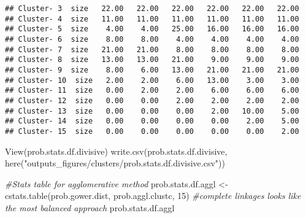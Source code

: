 \documentclass[
]{article}
\newenvironment{Shaded}{\begin{snugshade}}{\end{snugshade}}
\newcommand{\CommentTok}[1]{\textcolor[rgb]{0.56,0.35,0.01}{\textit{#1}}}
\newcommand{\DecValTok}[1]{\textcolor[rgb]{0.00,0.00,0.81}{#1}}
\newcommand{\FunctionTok}[1]{\textcolor[rgb]{0.00,0.00,0.00}{#1}}
\newcommand{\NormalTok}[1]{#1}
\newcommand{\OtherTok}[1]{\textcolor[rgb]{0.56,0.35,0.01}{#1}}
\newcommand{\StringTok}[1]{\textcolor[rgb]{0.31,0.60,0.02}{#1}}
\begin{document}
\begin{verbatim}
## Cluster- 3  size   22.00   22.00   22.00   22.00   22.00   22.00
## Cluster- 4  size   11.00   11.00   11.00   11.00   11.00   11.00
## Cluster- 5  size    4.00    4.00   25.00   16.00   16.00   16.00
## Cluster- 6  size    8.00    8.00    4.00    4.00    4.00    4.00
## Cluster- 7  size   21.00   21.00    8.00    8.00    8.00    8.00
## Cluster- 8  size   13.00   13.00   21.00    9.00    9.00    9.00
## Cluster- 9  size    8.00    6.00   13.00   21.00   21.00   21.00
## Cluster- 10  size   2.00    2.00    6.00   13.00    3.00    3.00
## Cluster- 11  size   0.00    2.00    2.00    6.00    6.00    6.00
## Cluster- 12  size   0.00    0.00    2.00    2.00    2.00    2.00
## Cluster- 13  size   0.00    0.00    0.00    2.00   10.00    5.00
## Cluster- 14  size   0.00    0.00    0.00    0.00    2.00    5.00
## Cluster- 15  size   0.00    0.00    0.00    0.00    0.00    2.00
\end{verbatim}

\begin{Shaded}
\begin{Highlighting}[]
\FunctionTok{View}\NormalTok{(prob.stats.df.divisive)}
\FunctionTok{write.csv}\NormalTok{(prob.stats.df.divisive, }\FunctionTok{here}\NormalTok{(}\StringTok{"outputs\_figures/clusters/prob.stats.df.divisive.csv"}\NormalTok{))}

\CommentTok{\#Stats table for agglomerative method}
\NormalTok{prob.stats.df.aggl }\OtherTok{\textless{}{-}} \FunctionTok{cstats.table}\NormalTok{(prob.gower.dist, prob.aggl.clustc, }\DecValTok{15}\NormalTok{) }
\CommentTok{\#complete linkages looks like the most balanced approach}
\NormalTok{prob.stats.df.aggl}
\end{Highlighting}
\end{Shaded}
\end{document}
